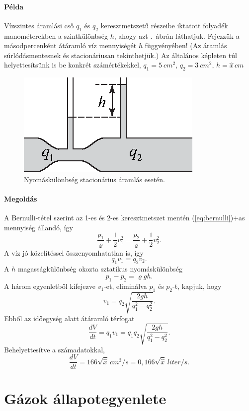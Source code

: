 \documentclass[12pt,a4paper]{scrartcl}
\begin{document}
\footnotesize
\paragraph{Példa}
Vízszintes áramlási cső $q_1$ és $q_2$ keresztmetszetű részeibe iktatott folyadék manométerekben a szintkülönbség $h$, ahogy azt .\ ábrán láthatjuk. Fejezzük a másodpercenként átáramló víz mennyiségét $h$ függvényében! (Az áramlás súrlódásmentesnek és stacionáriusan tekinthetjük.) Az általános képleten túl helyettesítsünk is be konkrét számértékekkel, $q_1 = \SI{5}{cm^2}$, $q_2 = \SI{3}{cm^2}$, $h={\hat x}\,\si{cm}$

\begin{figure}[htb] 
\centering    
\includegraphics[scale=1]{figs/bernoulli_pelda.eps}
\caption{Nyomáskülönbség stacionárius áramlás esetén.}
\label{fig:bernoulli}
\end{figure}
\FloatBarrier

\paragraph{Megoldás}

A Bernulli-tétel szerint az 1-es és 2-es keresztmetszet mentén \atold(\ref{eq:bernulli})+as{} mennyiség állandó, így 
\[\frac{{{p_1}}}{\varrho } + \frac{1}{2}v_1^2 = \frac{{{p_2}}}{\varrho } + \frac{1}{2}v_2^2.\]
A víz jó közelítéssel összenyomhatatlan is, így 
\[{q_1}{v_1} = {q_2}{v_2}.\]
A $h$ magasságkülönbség okozta sztatikus nyomáskülönbség
\[{p_1} - {p_2} = \varrho gh.\]
A három egyenletből kifejezve $v_1$-et, eliminálva $p_1$ és $p_2$-t, kapjuk, hogy 
\[{v_1} = {q_2}\sqrt {\frac{{2gh}}{{q_1^2 - q_2^2}}}.\]
Ebből az időegység alatt átáramló térfogat
\[\frac{{dV}}{{dt}} = {q_1}{v_1} = {q_1}{q_2}\sqrt {\frac{{2gh}}{{q_1^2 - q_2^2}}} .\]
Behelyettesítve a számadatokkal, 
\[\frac{{dV}}{{dt}} = 166\sqrt {\hat x}\,\si{cm^3/s} = 0{,}166\sqrt{{\hat x}}\,\si{liter/s}.\]
\normalsize

\section{Gázok állapotegyenlete}
\end{document}
